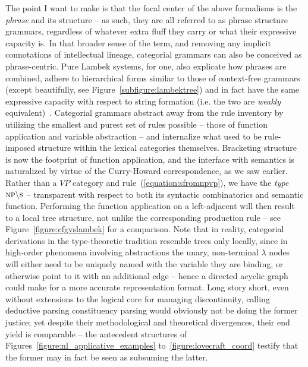 The point I want to make is that the focal center of the above formalisms is the \textit{phrase} and its structure -- as such, they are all referred to as phrase structure grammars, regardless of whatever extra fluff they carry or what their expressive capacity is.
In that broader sense of the term, and removing any implicit connotations of intellectual lineage, categorial grammars can also be conceived as phrase-centric.
Pure Lambek systems, for one, also explicate how phrases are combined, adhere to hierarchical forms similar to those of context-free grammars (except beautifully, see Figure~\ref{subfigure:lambektree}) and in fact have the same expressive capacity with respect to string formation (i.e. the two are \textit{weakly} equivalent)~\cite{pentus1993lambek}.
Categorial grammars abstract away from the rule inventory by utilizing the smallest and purest set of rules possible -- those of function application and variable abstraction -- and internalize what used to be rule-imposed structure within the lexical categories themselves.
Bracketing structure is now the footprint of function application, and the interface with semantics is naturalized by virtue of the Curry-Howard correspondence, as we saw earlier.
Rather than a $VP$ category and rule~(\ref{equation:sfromnpvp}), we have the \textit{type} $\np[s]\divleft\s[s]$ -- transparent with respect to both its syntactic combinatorics and semantic function.
Performing the function application on a left-adjacent \np[s] will then result to a local tree structure, not unlike the corresponding production rule -- see Figure~\ref{figure:cfgvslambek} for a comparison.
Note that in reality, categorial derivations in the type-theoretic tradition resemble trees only locally, since in high-order phenomena involving abstractions the unary, non-terminal $\lambda$ nodes will either need to be uniquely named with the variable they are binding, or otherwise point to it  with an additional edge -- hence a directed acyclic graph could make for a more accurate representation format.
Long story short, even without extensions to the logical core for managing discontinuity, calling deductive parsing constituency parsing would obviously not be doing the former justice; yet despite their methodological and theoretical divergences, their end yield is comparable -- the antecedent structures of Figures~\ref{figure:nl_applicative_examples} to~\ref{figure:lovecraft_coord} testify that the former may in fact be seen as subsuming the latter.

